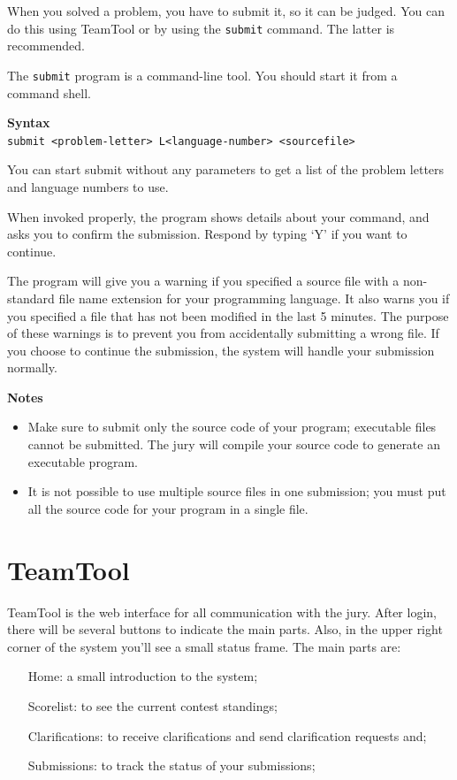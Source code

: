 \documentclass[a4paper]{artikel3}
\newcommand{\cmd}[1]{\texttt{#1}}
\newcommand{\strong}[1]{\textbf{#1}}
\newcommand{\syntax}[1]{\textbf{Syntax}\\\cmd{#1}}
\begin{document}
When you solved a problem, you have to submit it, so it can be judged. You
can do this using TeamTool or by using the \cmd{submit} command. The latter
is recommended.

The \cmd{submit} program is a command-line tool. You should start it from a
command shell.

\syntax{submit <problem-letter> L<language-number> <sourcefile>}

You can start submit without any parameters to get a list of the problem
letters and language numbers to use.

When invoked properly, the program shows details about your command, and
asks you to confirm the submission. Respond by typing `Y' if you want to
continue.

The program will give you a warning if you specified a source file with a
non-standard file name extension for your programming language. It also
warns you if you specified a file that has not been modified in the last 5
minutes. The purpose of these warnings is to prevent you from accidentally
submitting a wrong file. If you choose to continue the submission, the
system will handle your submission normally.

\strong{Notes}
\begin{itemize}
\item Make sure to submit only the source code of your program; executable
files cannot be submitted. The jury will compile your source code to
generate an executable program.

\item It is not possible to use multiple source files in one submission; you
must put all the source code for your program in a single file.
\end{itemize}

\section{TeamTool}

TeamTool is the web interface for all communication with the jury. After
login, there will be several buttons to indicate the main parts. Also, in
the upper right corner of the system you'll see a small status frame. The
main parts are:

\begin{itemize}
\item[Home:] a small introduction to the system;
\item[Scorelist:] to see the current contest standings;
\item[Clarifications:] to receive clarifications and send clarification
requests and;
\item[Submissions:] to track the status of your submissions;
\end{itemize}
\end{document}
